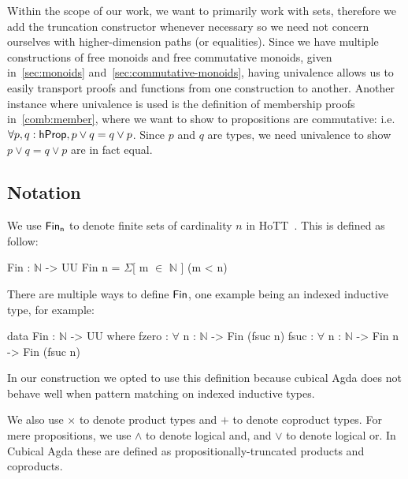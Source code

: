 Within the scope of our work, we want to primarily work with
sets, therefore we add the truncation constructor whenever necessary so we need not concern ourselves
with higher-dimension paths (or equalities). Since we have multiple constructions of free monoids
and free commutative monoids, given in~\cref{sec:monoids} and~\cref{sec:commutative-monoids},
having univalence allows us to easily transport proofs and functions from one construction to another.
Another instance where univalence is used is the definition of membership proofs in~\cref{comb:member},
where we want to show to propositions are commutative: i.e. $\forall p, q: \mathsf{hProp}, p \vee q = q \vee p$.
Since $p$ and $q$ are types, we need univalence to show $p \vee q = q \vee p$ are in fact equal.

\subsection{Notation}
We use $\Fin[n]$ to denote finite sets of cardinality $n$ in HoTT~\cite{yorgeyCombinatorialSpeciesLabelled2014a}.
This is defined as follow:
\vspace{-1em}
\begin{code}
Fin : $\mathbb{N}$ -> UU
Fin n = $\Sigma$[ m $\in$ $\mathbb{N}$ ] (m < n)
\end{code}

There are multiple ways to define $\Fin$, one example being an indexed inductive type,
for example:
\vspace{-1em}
\begin{code}
data Fin : $\mathbb{N}$ -> UU where
    fzero : $\forall$ {n : $\mathbb{N}$} -> Fin (fsuc n)
    fsuc  : $\forall$ {n : $\mathbb{N}$} -> Fin n -> Fin (fsuc n)
\end{code}
In our construction we opted to use this definition because cubical Agda does not behave well
when pattern matching on indexed inductive types.

We also use $\times$ to denote product types and $+$ to denote coproduct types.
For mere propositions, we use $\land$ to denote logical and, and $\vee$ to denote logical or.
In Cubical Agda these are defined as propositionally-truncated products and coproducts.